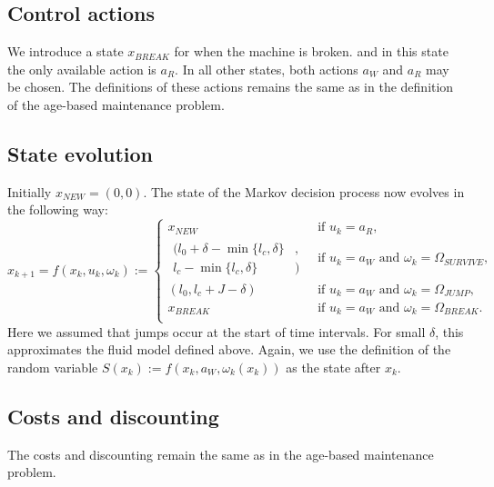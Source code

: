 \subsection{Control actions}
We introduce a state $x_{BREAK}$ for when the machine is broken.
and in this state the only available action is $a_R$.
In all other states, both actions $a_W$ and $a_R$ may be chosen.
The definitions of these actions remains the same as in the definition of the age-based maintenance problem.

\subsection{State evolution}
Initially $x_{NEW}=(0,0)$.
The state of the Markov decision process now evolves in the following way:
\[
x_{k+1}=f(x_k, u_k, \omega_k):=\begin{cases}
x_{NEW}&\ \text{if }u_k=a_R,\\
\begin{split}(l_0+\delta-\min\{l_c,\delta\}&,\\l_c-\min\{l_c,\delta\}&)\end{split}&\ \text{if }u_k=a_W\text{ and }\omega_k=\Omega_{SURVIVE},\\
(l_0,l_c+J-\delta)&\ \text{if }u_k=a_W\text{ and }\omega_k=\Omega_{JUMP},\\
x_{BREAK}&\ \text{if }u_k=a_W\text{ and }\omega_k=\Omega_{BREAK}.\\
\end{cases}
\]
Here we assumed that jumps occur at the start of time intervals.
For small $\delta$, this approximates the fluid model defined above.
Again, we use the definition of the random variable $S(x_k):=f(x_k,a_W,\omega_k(x_k))$ as the state after $x_k$.

\subsection{Costs and discounting}
The costs and discounting remain the same as in the age-based maintenance problem.

